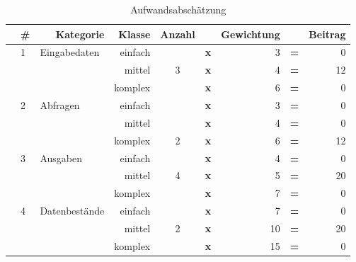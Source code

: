 \begin{table}[htbp]
	\centering
	\caption{Aufwandsabschätzung}
	\begin{tabular}{rlrrccrcr}
		\toprule
		\textbf{} & \textbf{\#} & \textbf{Kategorie} & \textbf{Klasse} & \textbf{Anzahl} & \textbf{} & \multicolumn{1}{c}{\textbf{Gewichtung}} & \textbf{} & \multicolumn{1}{c}{\textbf{Beitrag}} \\
		\midrule
		\multicolumn{1}{l}{\textbf{}} & \multirow{3}[6]{*}{1} & \multicolumn{1}{l}{\multirow{3}[6]{*}{Eingabedaten}} & einfach &       & \textbf{x} & 3     & \textbf{=} & 0 \\
		\multicolumn{1}{l}{\textbf{}} &       & \multicolumn{1}{l}{} & mittel & 3     & \textbf{x} & 4     & \textbf{=} & 12 \\
		\multicolumn{1}{l}{\textbf{}} &       & \multicolumn{1}{l}{} & komplex &       & \textbf{x} & 6     & \textbf{=} & 0 \\ \hline			\multicolumn{1}{l}{\textbf{}} & \multirow{3}[6]{*}{2} & \multicolumn{1}{l}{\multirow{3}[6]{*}{Abfragen}} & einfach &       & \textbf{x} & 3     & \textbf{=} & 0 \\
		\multicolumn{1}{l}{\textbf{}} &       & \multicolumn{1}{l}{} & mittel &       & \textbf{x} & 4     & \textbf{=} & 0 \\
		\multicolumn{1}{l}{\textbf{}} &       & \multicolumn{1}{l}{} & komplex & 2     & \textbf{x} & 6     & \textbf{=} & 12 \\ \hline
		\multicolumn{1}{l}{\textbf{}} & \multirow{3}[6]{*}{3} & \multicolumn{1}{l}{\multirow{3}[6]{*}{Ausgaben}} & einfach &       & \textbf{x} & 4     & \textbf{=} & 0 \\
		\multicolumn{1}{l}{\textbf{}} &       & \multicolumn{1}{l}{} & mittel & 4     & \textbf{x} & 5     & \textbf{=} & 20 \\
		\multicolumn{1}{l}{\textbf{}} &       & \multicolumn{1}{l}{} & komplex &       & \textbf{x} & 7     & \textbf{=} & 0 \\ \hline
		\multicolumn{1}{l}{\textbf{}} & \multirow{3}[6]{*}{4} & \multicolumn{1}{l}{\multirow{3}[6]{*}{Datenbestände}} & einfach &       & \textbf{x} & 7     & \textbf{=} & 0 \\
		\multicolumn{1}{l}{\textbf{}} &       & \multicolumn{1}{l}{} & mittel & 2     & \textbf{x} & 10    & \textbf{=} & 20 \\
		\multicolumn{1}{l}{\textbf{}} &       & \multicolumn{1}{l}{} & komplex &       & \textbf{x} & 15    & \textbf{=} & 0 \\ \hline

\end{tabular}
\end{table}
